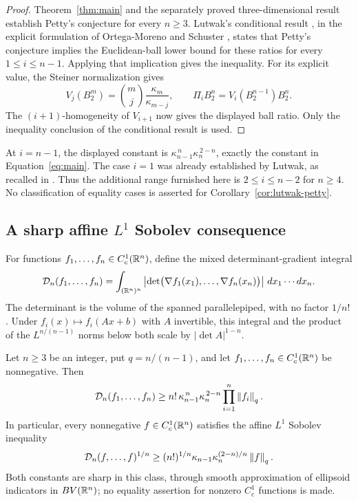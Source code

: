 \begin{proof}
Theorem~\ref{thm:main} and the separately proved three-dimensional
result \cite[Theorem~1.1]{ChenEtAl2026} establish Petty's conjecture for
every $n\ge3$. Lutwak's conditional result \cite{Lutwak1990}, in the
explicit formulation of Ortega-Moreno and Schuster
\cite[author version, Introduction, p.~2]{OrtegaMorenoSchuster2021},
states that Petty's conjecture implies the Euclidean-ball lower bound
for these ratios for every $1\le i\le n-1$. Applying that implication
gives the inequality. For its explicit value, the Steiner normalization
gives
\[
 V_j(B_2^m)=\binom{m}{j}\frac{\kappa_m}{\kappa_{m-j}},
 \qquad
 \Pi_iB_2^n=V_i(B_2^{n-1})B_2^n.
\]
The $(i+1)$-homogeneity of $V_{i+1}$ now gives the displayed ball
ratio. Only the inequality conclusion of the conditional result is used.
\end{proof}

At $i=n-1$, the displayed constant is
$\kappa_{n-1}^{\,n}\kappa_n^{\,2-n}$, exactly the constant in
Equation~\eqref{eq:main}. The case $i=1$ was already established by
Lutwak, as recalled in
\cite[author version, Introduction, p.~2]{OrtegaMorenoSchuster2021}.
Thus the additional range furnished here is $2\le i\le n-2$ for
$n\ge4$. No classification of equality cases is asserted for
Corollary~\ref{cor:lutwak-petty}.

\subsection{A sharp affine \texorpdfstring{$L^1$}{L1} Sobolev consequence}

For functions $f_1,\ldots,f_n\in C_c^1(\mathbb R^n)$, define the mixed
determinant-gradient integral
\[
 \mathcal D_n(f_1,\ldots,f_n)
 =\int_{(\mathbb R^n)^n}
 \left|\det\bigl(\nabla f_1(x_1),\ldots,\nabla f_n(x_n)\bigr)\right|
 \,dx_1\cdots dx_n.
\]
The determinant is the volume of the spanned parallelepiped, with no
factor $1/n!$. Under $f_i(x)\mapsto f_i(Ax+b)$ with $A$ invertible,
this integral and the product of the $L^{n/(n-1)}$ norms below both
scale by $|\det A|^{1-n}$.

\begin{corollary}
\label{cor:affine-sobolev}
Let $n\ge3$ be an integer, put $q=n/(n-1)$, and let
$f_1,\ldots,f_n\in C_c^1(\mathbb R^n)$ be nonnegative. Then
\begin{equation}\label{eq:mixed-affine-sobolev}
 \mathcal D_n(f_1,\ldots,f_n)
 \ge n!\,\kappa_{n-1}^{\,n}\kappa_n^{\,2-n}
       \prod_{i=1}^n\left\lVert f_i\right\rVert_q.
\end{equation}
In particular, every nonnegative $f\in C_c^1(\mathbb R^n)$ satisfies the
affine $L^1$ Sobolev inequality
\begin{equation}\label{eq:affine-sobolev}
 \mathcal D_n(f,\ldots,f)^{1/n}
 \ge (n!)^{1/n}\kappa_{n-1}\kappa_n^{(2-n)/n}\left\lVert f\right\rVert_q.
\end{equation}
Both constants are sharp in this class, through smooth approximation
of ellipsoid indicators in $BV(\mathbb R^n)$; no equality assertion for nonzero
$C_c^1$ functions is made.
\end{corollary}

